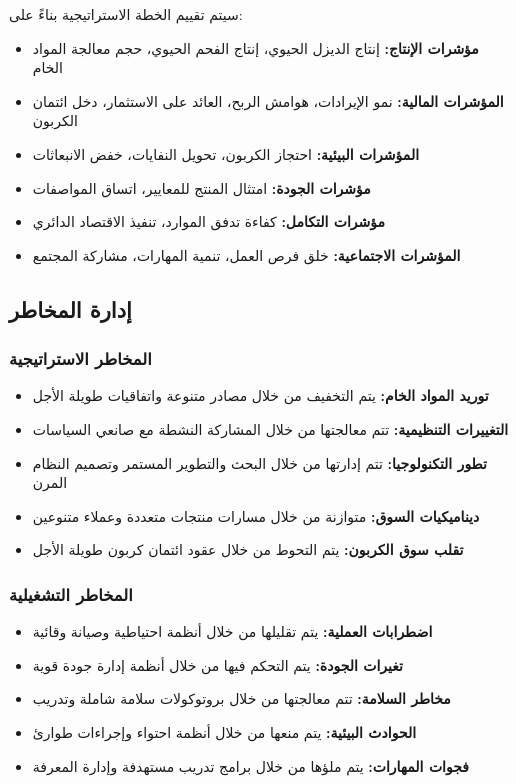 سيتم تقييم الخطة الاستراتيجية بناءً على:

\begin{itemize}
    \item \textbf{مؤشرات الإنتاج:} إنتاج الديزل الحيوي، إنتاج الفحم الحيوي، حجم معالجة المواد الخام
    \item \textbf{المؤشرات المالية:} نمو الإيرادات، هوامش الربح، العائد على الاستثمار، دخل ائتمان الكربون
    \item \textbf{المؤشرات البيئية:} احتجاز الكربون، تحويل النفايات، خفض الانبعاثات
    \item \textbf{مؤشرات الجودة:} امتثال المنتج للمعايير، اتساق المواصفات
    \item \textbf{مؤشرات التكامل:} كفاءة تدفق الموارد، تنفيذ الاقتصاد الدائري
    \item \textbf{المؤشرات الاجتماعية:} خلق فرص العمل، تنمية المهارات، مشاركة المجتمع
\end{itemize}

\subsection{إدارة المخاطر}

\subsubsection{المخاطر الاستراتيجية}
\begin{itemize}
    \item \textbf{توريد المواد الخام:} يتم التخفيف من خلال مصادر متنوعة واتفاقيات طويلة الأجل
    \item \textbf{التغييرات التنظيمية:} تتم معالجتها من خلال المشاركة النشطة مع صانعي السياسات
    \item \textbf{تطور التكنولوجيا:} تتم إدارتها من خلال البحث والتطوير المستمر وتصميم النظام المرن
    \item \textbf{ديناميكيات السوق:} متوازنة من خلال مسارات منتجات متعددة وعملاء متنوعين
    \item \textbf{تقلب سوق الكربون:} يتم التحوط من خلال عقود ائتمان كربون طويلة الأجل
\end{itemize}

\subsubsection{المخاطر التشغيلية}
\begin{itemize}
    \item \textbf{اضطرابات العملية:} يتم تقليلها من خلال أنظمة احتياطية وصيانة وقائية
    \item \textbf{تغيرات الجودة:} يتم التحكم فيها من خلال أنظمة إدارة جودة قوية
    \item \textbf{مخاطر السلامة:} تتم معالجتها من خلال بروتوكولات سلامة شاملة وتدريب
    \item \textbf{الحوادث البيئية:} يتم منعها من خلال أنظمة احتواء وإجراءات طوارئ
    \item \textbf{فجوات المهارات:} يتم ملؤها من خلال برامج تدريب مستهدفة وإدارة المعرفة
\end{itemize}
